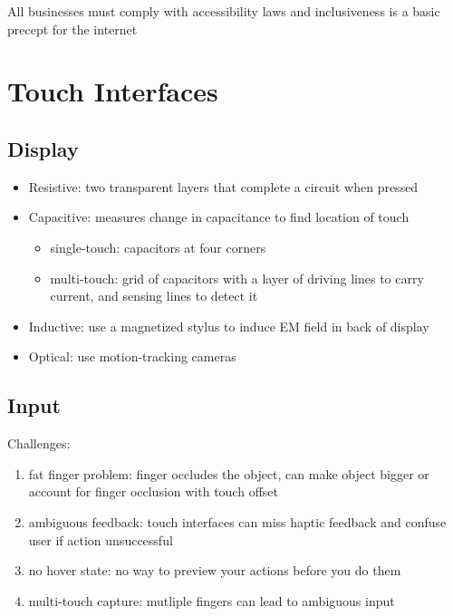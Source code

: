 \documentclass[]{article}
\theoremstyle{definition}
\begin{document}
	All businesses must comply with accessibility laws and inclusiveness is a basic precept for the internet

	\section{Touch Interfaces}
	\subsection{Display}
	\begin{itemize}
		\item Resistive: two transparent layers that complete a circuit when pressed
		\item Capacitive: measures change in capacitance to find location of touch
			\begin{itemize}
				\item single-touch: capacitors at four corners
				\item multi-touch: grid of capacitors with a layer of driving lines to carry current, and sensing lines to detect it
			\end{itemize}
		\item Inductive: use a magnetized stylus to induce EM field in back of display
		\item Optical: use motion-tracking cameras
	\end{itemize}

	\subsection{Input}
	Challenges:
	\begin{enumerate}
		\item fat finger problem: finger occludes the object, can make object bigger or account for finger occlusion with touch offset
		\item ambiguous feedback: touch interfaces can miss haptic feedback and confuse user if action unsuccessful
		\item no hover state: no way to preview your actions before you do them
		\item multi-touch capture: mutliple fingers can lead to ambiguous input
	\end{enumerate}
\end{document}

